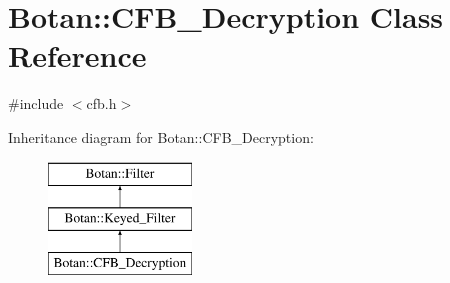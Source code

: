\hypertarget{classBotan_1_1CFB__Decryption}{\section{Botan\-:\-:C\-F\-B\-\_\-\-Decryption Class Reference}
\label{classBotan_1_1CFB__Decryption}
}


{\ttfamily \#include $<$cfb.\-h$>$}

Inheritance diagram for Botan\-:\-:C\-F\-B\-\_\-\-Decryption\-:\begin{figure}[H]
\begin{center}
\leavevmode
\includegraphics[height=3.000000cm]{classBotan_1_1CFB__Decryption}
\end{center}
\end{figure}
